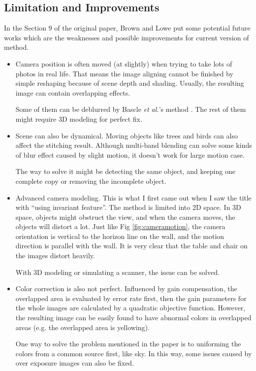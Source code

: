 \documentclass[10pt,twocolumn,letterpaper]{article}
\begin{document}
\subsection{Limitation and Improvements}
In the Section 9 of the original paper, Brown and Lowe put some potential future works which are the weaknesses and possible improvements for current version of method.
\begin{itemize}
    \item
        Camera position is often moved (at slightly) when trying to take lots of photos in real life.
        That means the image aligning cannot be finished by simple reshaping because of scene depth and shading.
        Usually, the resulting image can contain overlapping effects.

        Some of them can be deblurred by Bascle \textit{et al.}'s method \cite{bascle}.
        The rest of them might require 3D modeling for perfect fix.
    \item
        Scene can also be dynamical. Moving objects like trees and birds can also affect the stitching result.
        Although multi-band blending can solve some kinds of blur effect caused by slight motion,
        it doesn't work for large motion case.

        The way to solve it might be detecting the same object, and keeping one complete copy or removing the incomplete object.
    \item
        Advanced camera modeling. This is what I first came out when I saw the title with ``using invariant feature''.
        The method is limited into 2D space. In 3D space, objects might obstruct the view, and when the camera moves, the objects will distort a lot.
        Just like Fig \ref{fig:cameramotion}, the camera orientation is vertical to the horizon line on the wall, and the motion direction is parallel with the wall.
        It is very clear that the table and chair on the images distort heavily.
        
        With 3D modeling or simulating a scanner, the issue can be solved.
    \item
        Color correction is also not perfect.
        Influenced by gain compensation, the overlapped area is evaluated by error rate first,
        then the gain parameters for the whole images are calculated by a quadratic objective function.
        However, the resulting image can be easily found to have abnormal colors in overlapped areas (e.g. the overlapped area is yellowing).

        One way to solve the problem mentioned in the paper is to uniforming the colors from a common source first, like sky.
        In this way, some issues caused by over exposure images can also be fixed.
\end{itemize}
\end{document}
